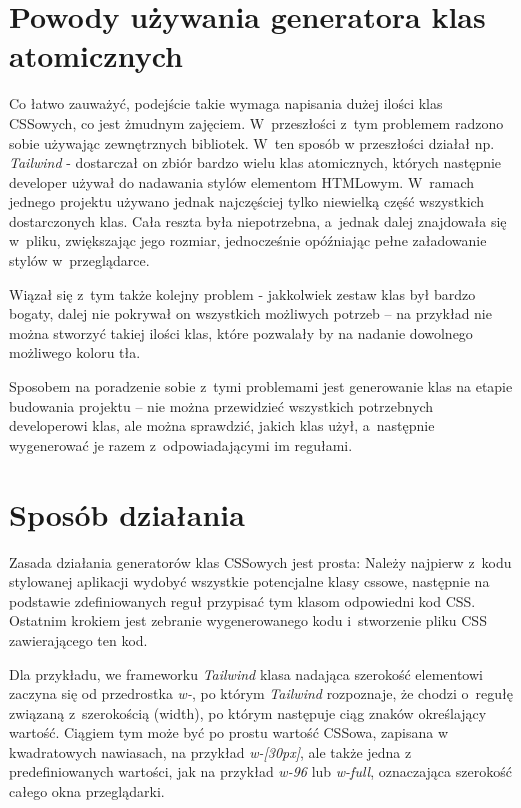 \documentclass{SGGW-thesis}
\begin{document}
\section{Powody używania generatora klas atomicznych}
Co łatwo zauważyć, podejście takie wymaga napisania dużej ilości klas CSSowych, co jest żmudnym zajęciem. W~przeszłości z~tym problemem radzono sobie używając zewnętrznych bibliotek. W~ten sposób w przeszłości działał np. \emph{Tailwind} - dostarczał on zbiór bardzo wielu klas atomicznych, których następnie developer używał do nadawania stylów elementom HTMLowym. W~ramach jednego projektu używano jednak najczęściej tylko niewielką część wszystkich dostarczonych klas. Cała reszta była niepotrzebna, a~jednak dalej znajdowała się w~pliku, zwiększając jego rozmiar, jednocześnie opóźniając pełne załadowanie stylów w~przeglądarce.

Wiązał się z~tym także kolejny problem - jakkolwiek zestaw klas był bardzo bogaty, dalej nie pokrywał on wszystkich możliwych potrzeb -- na przykład nie można stworzyć takiej ilości klas, które pozwalały by na nadanie dowolnego możliwego koloru tła.

Sposobem na poradzenie sobie z~tymi problemami jest generowanie klas na etapie budowania projektu -- nie można przewidzieć wszystkich potrzebnych developerowi klas, ale można sprawdzić, jakich klas użył, a~następnie wygenerować je razem z~odpowiadającymi im regułami.


\section{Sposób działania}
Zasada działania generatorów klas CSSowych jest prosta: Należy najpierw z~kodu stylowanej aplikacji wydobyć wszystkie potencjalne klasy cssowe, następnie na podstawie zdefiniowanych reguł przypisać tym klasom odpowiedni kod CSS. Ostatnim krokiem jest zebranie wygenerowanego kodu i~stworzenie pliku CSS zawierającego ten kod.

Dla przykładu, we frameworku \emph{Tailwind} klasa nadająca szerokość elementowi zaczyna się od przedrostka \emph{w-}, po którym \emph{Tailwind} rozpoznaje, że chodzi o~regułę związaną z~szerokością (width), po którym następuje ciąg znaków określający wartość. Ciągiem tym może być po prostu wartość CSSowa, zapisana w kwadratowych nawiasach, na przykład \emph{w-[30px]}, ale także jedna z predefiniowanych wartości, jak na przykład \emph{w-96} lub \emph{w-full}, oznaczająca szerokość całego okna przeglądarki\cite{Tailwind_jit}.
\end{document}
